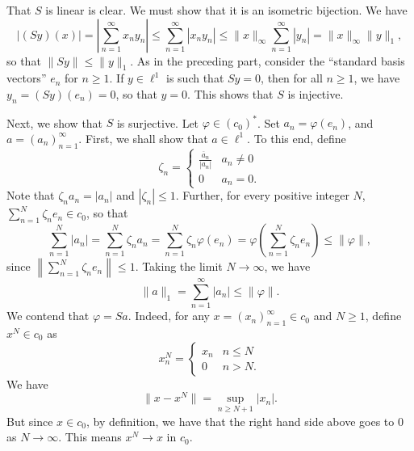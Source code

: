 \documentclass[11pt]{article}
\theoremstyle{thmstyle}
\theoremstyle{defstyle}
\renewcommand{\le}{\leqslant}
\renewcommand{\ge}{\geqslant}
\begin{document}
That $S$ is linear is clear. We must show that it is an isometric bijection. We have 
\begin{equation*}
    |(Sy)(x)| = \left|\sum_{n = 1}^\infty x_ny_n\right|\le\sum_{n = 1}^\infty |x_ny_n|\le \|x\|_\infty\sum_{n = 1}^\infty |y_n| = \|x\|_\infty \|y\|_1,
\end{equation*}
so that $\|Sy\|\le \|y\|_1$. As in the preceding part, consider the ``standard basis vectors'' $e_n$ for $n\ge 1$. If $y\in\ell^1$ is such that $Sy = 0$, then for all $n\ge 1$, we have $y_n = (Sy)(e_n) = 0$, so that $y = 0$. This shows that $S$ is injective. 

Next, we show that $S$ is surjective. Let $\varphi\in (c_0)^\ast$. Set $a_n = \varphi(e_n)$, and $a = (a_n)_{n =1 }^\infty$. First, we shall show that $a\in\ell^1$. To this end, define 
\begin{equation*}
    \zeta_n = 
    \begin{cases}
        \frac{\overline a_n}{|a_n|} & a_n\ne 0\\
        0 & a_n = 0.
    \end{cases}
\end{equation*}
Note that $\zeta_n a_n = |a_n|$ and $|\zeta_n|\le 1$. Further, for every positive integer $N$, $\displaystyle\sum_{n = 1}^N \zeta_n e_n\in c_0$, so that 
\begin{equation*}
    \sum_{n = 1}^N|a_n| = \sum_{n = 1}^N \zeta_n a_n = \sum_{n = 1}^N \zeta_n\varphi(e_n) = \varphi\left(\sum_{n = 1}^N \zeta_n e_n\right)\le \|\varphi\|,
\end{equation*}
since $\displaystyle\left\|\sum_{n = 1}^N \zeta_n e_n\right\|\le 1$. Taking the limit $N\to\infty$, we have 
\begin{equation*}
    \|a\|_1 = \sum_{n = 1}^\infty |a_n|\le\|\varphi\|.
\end{equation*}
We contend that $\varphi = Sa$. Indeed, for any $x = (x_n)_{n = 1}^\infty\in c_0$ and $N\ge 1$, define $x^N\in c_0$ as 
\begin{equation*}
    x^N_n = \begin{cases}
        x_n & n\le N\\
        0 & n > N.
    \end{cases}
\end{equation*}
We have 
\begin{equation*}
    \|x - x^N\| = \sup_{n\ge N + 1} |x_n|.
\end{equation*}
But since $x\in c_0$, by definition, we have that the right hand side above goes to $0$ as $N\to\infty$. This means $x^N\to x$ in $c_0$.
\end{document}
